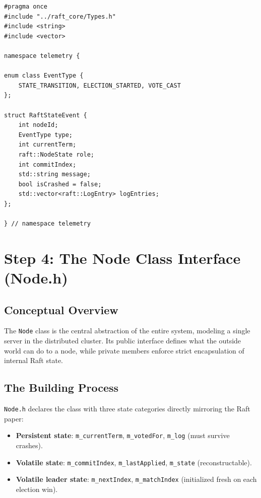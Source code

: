 \documentclass[11pt, a4paper]{article}
\begin{document}
\begin{lstlisting}[style=cppstyle, caption={backend/src/telemetry/TelemetryTypes.h}]
#pragma once
#include "../raft_core/Types.h"
#include <string>
#include <vector>

namespace telemetry {

enum class EventType {
    STATE_TRANSITION, ELECTION_STARTED, VOTE_CAST
};

struct RaftStateEvent {
    int nodeId;
    EventType type;
    int currentTerm;
    raft::NodeState role;
    int commitIndex;
    std::string message;
    bool isCrashed = false;
    std::vector<raft::LogEntry> logEntries;
};

} // namespace telemetry
\end{lstlisting}

\newpage

\section{Step 4: The Node Class Interface (Node.h)}

\subsection{Conceptual Overview}
The \texttt{Node} class is the central abstraction of the entire system,
modeling a single server in the distributed cluster. Its public interface
defines what the outside world can do to a node, while private members
enforce strict encapsulation of internal Raft state.

\subsection{The Building Process}
\texttt{Node.h} declares the class with three state categories directly
mirroring the Raft paper:
\begin{itemize}[leftmargin=*]
    \item \textbf{Persistent state}: \texttt{m\_currentTerm},
          \texttt{m\_votedFor}, \texttt{m\_log} (must survive crashes).
    \item \textbf{Volatile state}: \texttt{m\_commitIndex},
          \texttt{m\_lastApplied}, \texttt{m\_state} (reconstructable).
    \item \textbf{Volatile leader state}: \texttt{m\_nextIndex},
          \texttt{m\_matchIndex} (initialized fresh on each election win).
\end{itemize}
\end{document}
